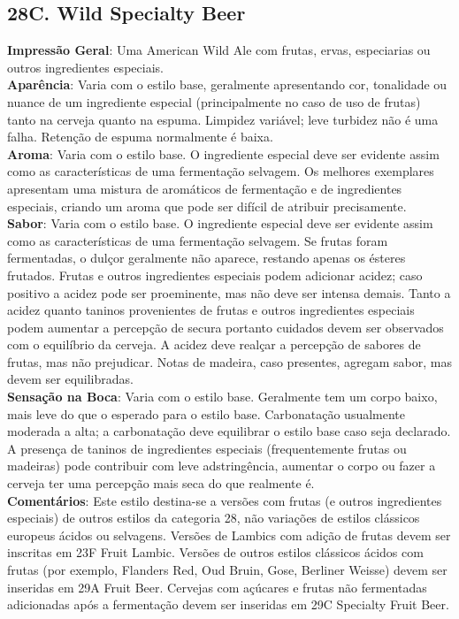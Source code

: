 \subsection*{28C. Wild Specialty Beer}
\textbf{Impressão Geral}: Uma American Wild Ale com frutas, ervas, especiarias ou outros ingredientes especiais. \\
\textbf{Aparência}: Varia com o estilo base, geralmente apresentando cor, tonalidade ou nuance de um ingrediente especial (principalmente no caso de uso de frutas) tanto na cerveja quanto na espuma. Limpidez variável; leve turbidez não é uma falha. Retenção de espuma normalmente é baixa. \\
\textbf{Aroma}: Varia com o estilo base. O ingrediente especial deve ser evidente assim como as características de uma fermentação selvagem. Os melhores exemplares apresentam uma mistura de aromáticos de fermentação e de ingredientes especiais, criando um aroma que pode ser difícil de atribuir precisamente. \\
\textbf{Sabor}: Varia com o estilo base. O ingrediente especial deve ser evidente assim como as características de uma fermentação selvagem. Se frutas foram fermentadas, o dulçor geralmente não aparece, restando apenas os ésteres frutados. Frutas e outros ingredientes especiais podem adicionar acidez; caso positivo a acidez pode ser proeminente, mas não deve ser intensa demais. Tanto a acidez quanto taninos provenientes de frutas e outros ingredientes especiais podem aumentar a percepção de secura portanto cuidados devem ser observados com o equilíbrio da cerveja. A acidez deve realçar a percepção de sabores de frutas, mas não prejudicar. Notas de madeira, caso presentes, agregam sabor, mas devem ser equilibradas. \\
\textbf{Sensação na Boca}: Varia com o estilo base. Geralmente tem um corpo baixo, mais leve do que o esperado para o estilo base. Carbonatação usualmente moderada a alta; a carbonatação deve equilibrar o estilo base caso seja declarado. A presença de taninos de ingredientes especiais (frequentemente frutas ou madeiras) pode contribuir com leve adstringência, aumentar o corpo ou fazer a cerveja ter uma percepção mais seca do que realmente é. \\
\textbf{Comentários}: Este estilo destina-se a versões com frutas (e outros ingredientes especiais) de outros estilos da categoria 28, não variações de estilos clássicos europeus ácidos ou selvagens. Versões de Lambics com adição de frutas devem ser inscritas em 23F Fruit Lambic. Versões de outros estilos clássicos ácidos com frutas (por exemplo, Flanders Red, Oud Bruin, Gose, Berliner Weisse) devem ser inseridas em 29A Fruit Beer. Cervejas com açúcares e frutas não fermentadas adicionadas após a fermentação devem ser inseridas em 29C Specialty Fruit Beer. \\
